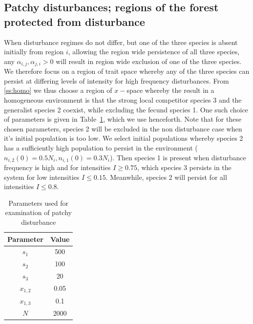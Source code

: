 \subsection{Patchy disturbances; regions of the forest protected from disturbance}
When disturbance regimes do not differ, but one of the three species is absent initially from region $i$, allowing the region wide persistence of all three species, any $\alpha_{i,j},\alpha_{j,i}>0$ will result in region wide exclusion of one of the three species. We therefore focus on a region of trait space whereby any of the three species can persist at differing levels of intensity for high frequency disturbances. From \ref{ss:homo} we thus choose a region of $x-$space whereby the result in a homogeneous environment is that the strong local competitor species 3 and the generalist species 2 coexist, while excluding the fecund species 1. One such choice of parameters is given in Table~\ref{tab:paras}, which we use henceforth. Note that for these chosen parameters, species 2 will be excluded in the non disturbance case when it's initial population is too low. We select initial populations whereby species 2 has a sufficiently high population to persist in the environment ($n_{i,2}(0)=0.5N_i,n_{i,1}(0)=0.3N_i$). Then species 1 is present when disturbance frequency is high and for intensities $I\geq0.75$, which species 3 persists in the system for low intensities $I\leq 0.15$. Meanwhile, species 2 will persist for all intensities $I\leq 0.8$.
\begin{table}[htdp]
\begin{center}
\begin{tabular}{|c|c|} \hline
Parameter & Value\\ \hline
$s_1$&500\\
$s_2$&100\\
$s_3$&20\\
$x_{1,2}$&0.05\\
$x_{1,3}$&0.1\\
$N$&2000\\ \hline
\end{tabular}
\end{center}
\caption{Parameters used for examination of patchy disturbance}
\label{tab:paras}
\end{table}
